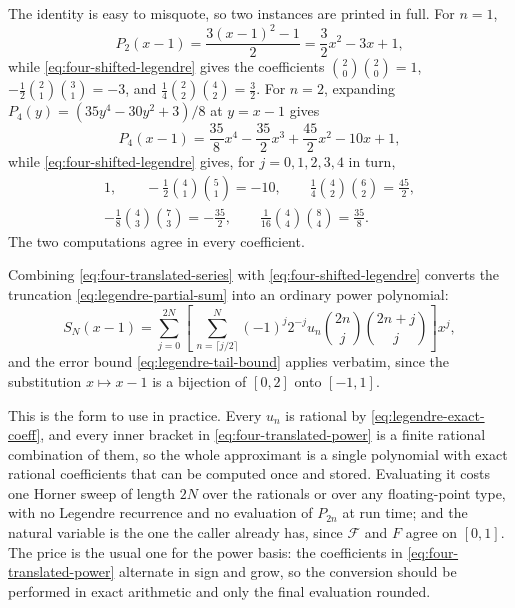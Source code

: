 \documentclass[11pt,oneside]{article}
\theoremstyle{definition}
\theoremstyle{remark}
\begin{document}
The identity is easy to misquote, so two instances are printed in full.  For $n=1$,
\begin{equation*}
 P_2(x-1)=\frac{3(x-1)^2-1}{2}=\frac32x^2-3x+1,
\end{equation*}
while \eqref{eq:four-shifted-legendre} gives the coefficients
$\binom20\binom20=1$, $-\tfrac12\binom21\binom31=-3$, and
$\tfrac14\binom22\binom42=\tfrac32$.  For $n=2$, expanding
$P_4(y)=(35y^4-30y^2+3)/8$ at $y=x-1$ gives
\begin{equation*}
 P_4(x-1)=\frac{35}{8}x^4-\frac{35}{2}x^3+\frac{45}{2}x^2-10x+1,
\end{equation*}
while \eqref{eq:four-shifted-legendre} gives, for $j=0,1,2,3,4$ in turn,
\begin{gather*}
 1,\qquad
 -\tfrac12\binom41\binom51=-10,\qquad
 \tfrac14\binom42\binom62=\tfrac{45}2,\\
 -\tfrac18\binom43\binom73=-\tfrac{35}2,\qquad
 \tfrac1{16}\binom44\binom84=\tfrac{35}8 .
\end{gather*}
The two computations agree in every coefficient.

Combining \eqref{eq:four-translated-series} with \eqref{eq:four-shifted-legendre} converts
the truncation \eqref{eq:legendre-partial-sum} into an ordinary power polynomial:
\begin{equation}
 S_N(x-1)=\sum_{j=0}^{2N}\left[\,\sum_{n=\lceil j/2\rceil}^{N}
 (-1)^j2^{-j}u_n\binom{2n}{j}\binom{2n+j}{j}\right]x^j,
                                                          \label{eq:four-translated-power}
\end{equation}
and the error bound \eqref{eq:legendre-tail-bound} applies verbatim, since the substitution
$x\mapsto x-1$ is a bijection of $[0,2]$ onto $[-1,1]$.

This is the form to use in practice.  Every $u_n$ is rational by
\eqref{eq:legendre-exact-coeff}, and every inner bracket in
\eqref{eq:four-translated-power} is a finite rational combination of them, so the whole
approximant is a single polynomial with exact rational coefficients that can be computed once
and stored.  Evaluating it costs one Horner sweep of length $2N$ over the rationals or over
any floating-point type, with no Legendre recurrence and no evaluation of $P_{2n}$ at run
time; and the natural variable is the one the caller already has, since $\mathcal F$ and $F$
agree on $[0,1]$.  The price is the usual one for the power basis: the coefficients in
\eqref{eq:four-translated-power} alternate in sign and grow, so the conversion should be
performed in exact arithmetic and only the final evaluation rounded.
\end{document}
